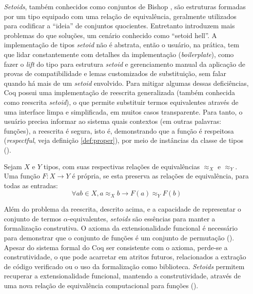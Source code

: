 \textit{Setoids}, também conhecidos como conjuntos de Bishop \cite{Barthe2003,Bishop2012}, são estruturas formadas por um tipo equipado com uma relação de equivalência, geralmente utilizados para codificar a ``ideia'' de conjuntos quocientes. Entretanto introduzem mais problemas do que soluções, um cenário conhecido como ``setoid hell''. A implementação de tipos \textit{setoid} não é abstrata, então o usuário, na prática, tem que lidar constantemente com detalhes da implementação (\textit{boilerplate}), como fazer o \textit{lift} do tipo para estrutura \textit{setoid} e gerenciamento manual da aplicação de provas de compatibilidade e lemas customizados de substituição, sem falar quando há mais de um \textit{setoid} envolvido. Para mitigar algumas dessas deficiências, Coq \cite{Sozeau2009} possui uma implementação de reescrita generalizada (também conhecida como reescrita \textit{setoid}), o que permite substituir termos equivalentes através de uma interface limpa e simplificada, em muitos casos transparente. Para tanto, o usuário precisa informar ao sistema quais contextos (em outras palavras: funções), a reescrita é segura, isto é, demonstrando que a função é respeitosa (\textit{respectful}, veja definição \ref{def:proper}), por meio de instâncias da classe de tipos  ().
\begin{definicao}\label{def:proper}
	Sejam $X$ e $Y$ tipos, com suas respectivas relações de equivalências $\approx_X$ e $\approx_Y$. Uma função $F: X \rightarrow Y$ é própria, se esta preserva as relações de equivalência, para todas as entradas:
	\begin{equation*}
		\forall a b \in X, a \approx_X b \rightarrow F(a) \approx_Y F(b)
	\end{equation*}
\end{definicao}

Além do problema da reescrita, descrito acima, e a capacidade de representar o conjunto de termos $\alpha$-equivalentes, \textit{setoids} são essências para manter a formalização construtiva. O axioma da extensionalidade funcional é necessário para demonstrar que o conjunto de funções é um conjunto de permutação (). Apesar do sistema formal do Coq ser consistente com o axioma, perde-se a construtividade, o que pode acarretar em atritos futuros, relacionados a extração de código verificado ou o uso da formalização como biblioteca. \textit{Setoids} permitem recuperar a extensionalidade funcional, mantendo a construtividade, através de uma nova relação de equivalência computacional para funções ().

